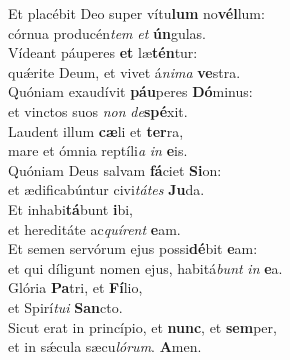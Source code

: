 \evenverse Et placébit Deo super vítu\textbf{lum} no\textbf{vél}lum:~\*\\
\evenverse córnua producén\textit{tem} \textit{et} \textbf{ún}gulas.\\
\oddverse Vídeant páuperes \textbf{et} læ\textbf{tén}tur:~\*\\
\oddverse quǽrite Deum, et vivet á\textit{ni}\textit{ma} \textbf{ve}stra.\\
\evenverse Quóniam exaudívit \textbf{páu}peres \textbf{Dó}minus:~\*\\
\evenverse et vinctos suos \textit{non} \textit{de}\textbf{spé}xit.\\
\oddverse Laudent illum \textbf{cæ}li et \textbf{ter}ra,~\*\\
\oddverse mare et ómnia reptíli\textit{a} \textit{in} \textbf{e}is.\\
\evenverse Quóniam Deus salvam \textbf{fá}ciet \textbf{Si}on:~\*\\
\evenverse et ædificabúntur civi\textit{tá}\textit{tes} \textbf{Ju}da.\\
\oddverse Et inhabi\textbf{tá}bunt \textbf{i}bi,~\*\\
\oddverse et hereditáte ac\textit{quí}\textit{rent} \textbf{e}am.\\
\evenverse Et semen servórum ejus possi\textbf{dé}bit \textbf{e}am:~\*\\
\evenverse et qui díligunt nomen ejus, habitá\textit{bunt} \textit{in} \textbf{e}a.\\
\oddverse Glória \textbf{Pa}tri, et \textbf{Fí}lio,~\*\\
\oddverse et Spirí\textit{tu}\textit{i} \textbf{San}cto.\\
\evenverse Sicut erat in princípio, et \textbf{nunc}, et \textbf{sem}per,~\*\\
\evenverse et in sǽcula sæcu\textit{ló}\textit{rum}. \textbf{A}men.\\
